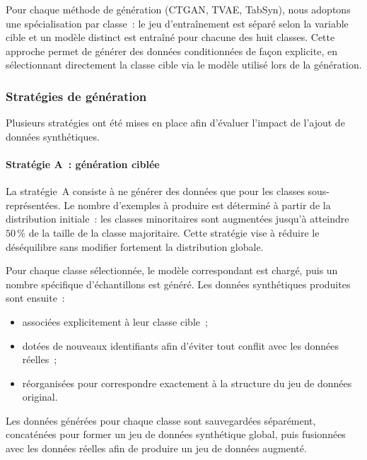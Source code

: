 \documentclass[conference]{IEEEtran}
\begin{document}
Pour chaque méthode de génération (CTGAN, TVAE, TabSyn), nous adoptons une spécialisation par classe~: le jeu d'entraînement est séparé selon la variable cible et un modèle distinct est entraîné pour chacune des huit classes. Cette approche permet de générer des données conditionnées de façon explicite, en sélectionnant directement la classe cible via le modèle utilisé lors de la génération.

\subsubsection{Stratégies de génération}
Plusieurs stratégies ont été mises en place afin d'évaluer l'impact de l'ajout de données synthétiques.

\paragraph{Stratégie A~: génération ciblée}
La stratégie~A consiste à ne générer des données que pour les classes sous-représentées. Le nombre d'exemples à produire est déterminé à partir de la distribution initiale~: les classes minoritaires sont augmentées jusqu'à atteindre $50\,\%$ de la taille de la classe majoritaire. Cette stratégie vise à réduire le déséquilibre sans modifier fortement la distribution globale.

Pour chaque classe sélectionnée, le modèle correspondant est chargé, puis un nombre spécifique d'échantillons est généré. Les données synthétiques produites sont ensuite~:
\begin{itemize}
    \item associées explicitement à leur classe cible~;
    \item dotées de nouveaux identifiants afin d'éviter tout conflit avec les données réelles~;
    \item réorganisées pour correspondre exactement à la structure du jeu de données original.
\end{itemize}
Les données générées pour chaque classe sont sauvegardées séparément, concaténées pour former un jeu de données synthétique global, puis fusionnées avec les données réelles afin de produire un jeu de données augmenté.
\end{document}
